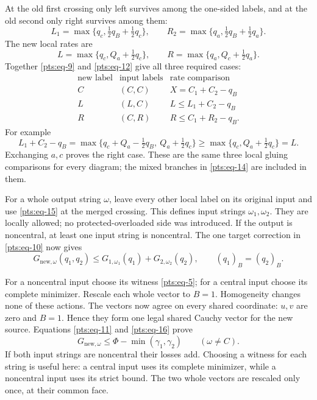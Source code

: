 At the old first crossing only left survives among the one-sided labels,
and at the old second only right survives among them: \begin{equation}\label{pts:eq-13}
L_1=\max\{q_c,\tfrac12q_B+\tfrac12q_c\},\qquad
 R_2=\max\{q_a,\tfrac12q_B+\tfrac12q_a\}.
\end{equation} The new local rates are \begin{equation}\label{pts:eq-14}
L=\max\{q_c,Q_a+\tfrac12q_c\},\qquad
 R=\max\{q_a,Q_c+\tfrac12q_a\}.
\end{equation} Together \eqref{pts:eq-9} and \eqref{pts:eq-12} give all three required cases: \begin{equation}\label{pts:eq-15}
\begin{array}{c|c|c}
 \text{new label}&\text{input labels}&\text{rate comparison}\\ \hline
 C&(C,C)&X=C_1+C_2-q_B\\
 L&(L,C)&L\le L_1+C_2-q_B\\
 R&(C,R)&R\le C_1+R_2-q_B .
 \end{array}
\end{equation} For example \[
 L_1+C_2-q_B
  =\max\{q_c+Q_a-\tfrac12q_B,\ Q_a+\tfrac12q_c\}
  \ge\max\{q_c,Q_a+\tfrac12q_c\}=L.
\] Exchanging \(a,c\) proves the right case. These are the same three
local gluing comparisons for every diagram; the mixed branches in
\eqref{pts:eq-14} are included in them.

For a whole output string \(\omega\), leave every other local label on
its original input and use \eqref{pts:eq-15} at the merged crossing. This defines
input strings \(\omega_1,\omega_2\). They are locally allowed; no
protected-overloaded side was introduced. If the output is noncentral,
at least one input string is noncentral. The one target correction in
\eqref{pts:eq-10} now gives \begin{equation}\label{pts:eq-16}
G_{\mathrm{new},\omega}(q_1,q_2)
             \le G_{1,\omega_1}(q_1)+G_{2,\omega_2}(q_2),
                    \qquad (q_1)_B=(q_2)_B.
\end{equation}

For a noncentral input choose its witness \eqref{pts:eq-5}; for a central input
choose its complete minimizer. Rescale each whole vector to \(B=1\).
Homogeneity changes none of these actions. The vectors now agree on
every shared coordinate: \(u,v\) are zero and \(B=1\). Hence they form
one legal shared Cauchy vector for the new source. Equations \eqref{pts:eq-11} and
\eqref{pts:eq-16} prove \begin{equation}\label{pts:eq-17}
G_{\mathrm{new},\omega}\le
       \Phi-\min(\gamma_1,\gamma_2)
                   \qquad(\omega\ne C).
\end{equation} If both input strings are noncentral their losses add. Choosing
a witness for each string is useful here: a central input uses its
complete minimizer, while a noncentral input uses its strict bound.
The two whole vectors are rescaled only once, at their common face.

